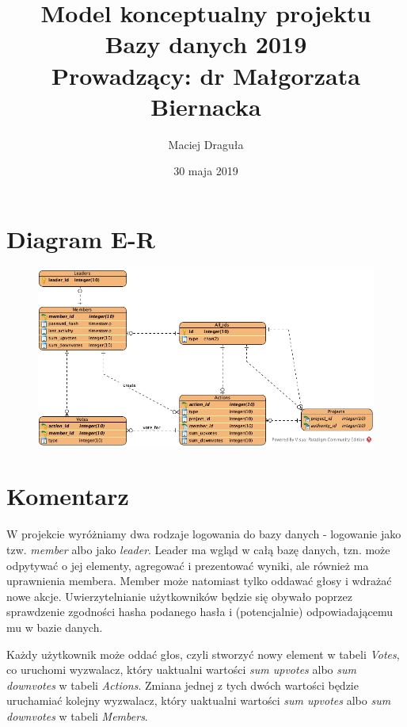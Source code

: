 \documentclass[12pt, a4paper]{article}
\begin{document}
\title{
	\textbf{Model konceptualny projektu \\ 
	Bazy danych 2019} \\
	Prowadzący: dr Małgorzata Biernacka}
	
\author{
	Maciej Draguła \\
}

\date{30 maja 2019}


\maketitle

\section{Diagram E-R}

\begin{figure}[h!]
	\centering
	\includegraphics[width = 17cm]{diagram.jpg}
	\caption{}
\end{figure}

\section{Komentarz}

W projekcie wyróżniamy dwa rodzaje logowania do bazy danych - logowanie jako tzw. \textit{member} albo jako \textit{leader}. Leader ma wgląd w całą bazę danych, tzn. może odpytywać o jej elementy, agregować i prezentować wyniki, ale również ma uprawnienia membera. Member może natomiast tylko oddawać głosy i wdrażać nowe akcje. Uwierzytelnianie użytkowników będzie się obywało poprzez sprawdzenie zgodności hasha podanego hasła i (potencjalnie) odpowiadającemu mu w bazie danych.

Każdy użytkownik może oddać głos, czyli stworzyć nowy element w tabeli \textit{Votes}, co uruchomi wyzwalacz, który uaktualni wartości \textit{sum upvotes} albo \textit{sum downvotes} w tabeli \textit{Actions}. Zmiana jednej z tych dwóch wartości będzie uruchamiać kolejny wyzwalacz, który uaktualni wartości \textit{sum upvotes} albo \textit{sum downvotes} w tabeli \textit{Members}.
\end{document}
